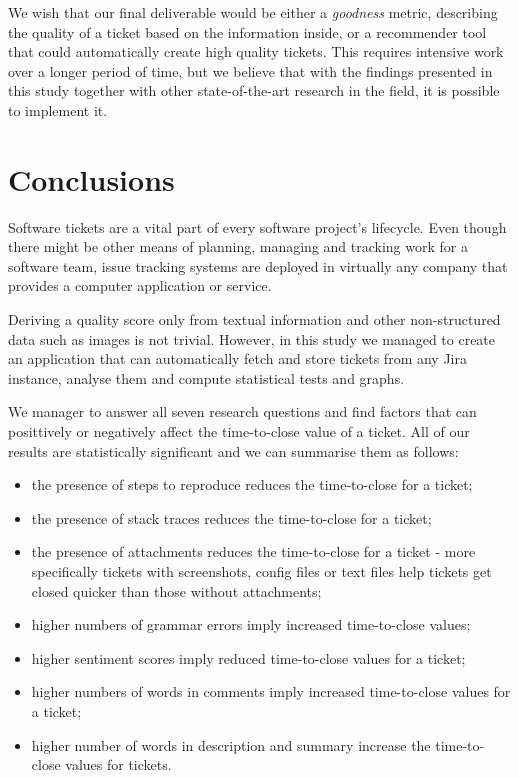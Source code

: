 \documentclass{mpaper}
\begin{document}
We wish that our final deliverable would be either a \emph{goodness} metric, describing the quality of a ticket based 
on the information inside, or a recommender tool that could automatically create high quality tickets. This requires 
intensive work over a longer period of time, but we believe that with the findings presented in this study together 
with other state-of-the-art research in the field, it is possible to implement it.

\section{Conclusions}\label{conclusions}

Software tickets are a vital part of every software project's lifecycle. Even though there might be other means
of planning, managing and tracking work for a software team, issue tracking systems are deployed in virtually any company
that provides a computer application or service.

Deriving a quality score only from textual information and other non-structured data such as images is not trivial. 
However, in this study we managed to create an application that can automatically fetch and store tickets from any 
Jira instance, analyse them and compute statistical tests and graphs.

We manager to answer all seven research questions and find factors that can posittively or 
negatively affect the time-to-close value of a ticket. All of our results are statistically significant and we can summarise 
them as follows:
\begin{itemize}
  \item the presence of steps to reproduce reduces the time-to-close for a ticket;
  \item the presence of stack traces reduces the time-to-close for a ticket;
  \item the presence of attachments reduces the time-to-close for a ticket - more specifically tickets with screenshots, 
  config files or text files help tickets get closed quicker than those without attachments;
  \item higher numbers of grammar errors imply increased time-to-close values;
  \item higher sentiment scores imply reduced time-to-close values for a ticket;
  \item higher numbers of words in comments imply increased time-to-close values for a ticket;
  \item higher number of words in description and summary increase the time-to-close values for tickets.
\end{itemize}
\end{document}

